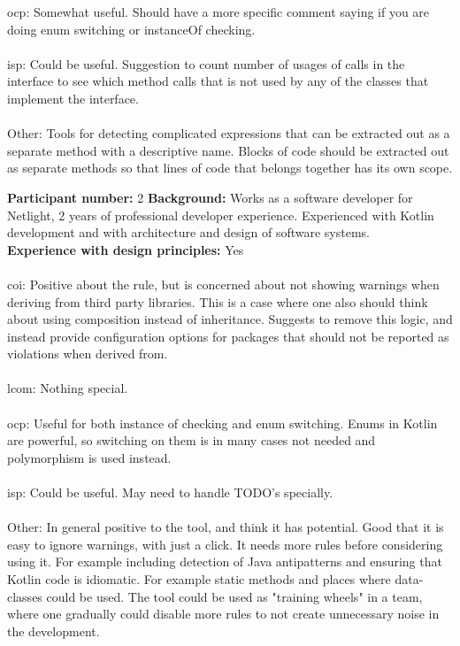 \noindent \gls{ocp}: Somewhat useful. Should have a more specific comment saying if you are doing enum switching or instanceOf checking. \\\\

\noindent \gls{isp}: Could be useful. Suggestion to count number of usages of calls in the interface to see which method calls that is not used by any of the classes that implement the interface. \\\\

\noindent Other: Tools for detecting complicated expressions that can be extracted out as a separate method with a descriptive name. Blocks of code should be extracted out as separate methods so that lines of code that belongs together has its own scope. 
\clearpage


\noindent\textbf{Participant number:} 2 \newline
\textbf{Background:} Works as a software developer for Netlight, 2 years of professional developer experience. Experienced with Kotlin development and with architecture and design of software systems.\\
\textbf{Experience with design principles:} Yes \\\\

\noindent \gls{coi}: Positive about the rule, but is concerned about not showing warnings when deriving from third party libraries. This is a case where one also should think about using composition instead of inheritance. Suggests to remove this logic, and instead provide configuration options for packages that should not be reported as violations when derived from.  \\\\

\noindent \gls{lcom}: Nothing special. \\\\

\noindent \gls{ocp}: Useful for both instance of checking and enum switching. Enums in Kotlin are powerful, so switching on them is in many cases not needed and polymorphism is used instead.\\\\

\noindent \gls{isp}: Could be useful. May need to handle TODO's specially. \\\\

\noindent Other: In general positive to the tool, and think it has potential. Good that it is easy to ignore warnings, with just a click. It needs more rules before considering using it. For example including detection of Java antipatterns and ensuring that Kotlin code is idiomatic. For example static methods and places where data-classes could be used. The tool could be used as "training wheels" in a team, where one gradually could disable more rules to not create unnecessary noise in the development.
\clearpage

